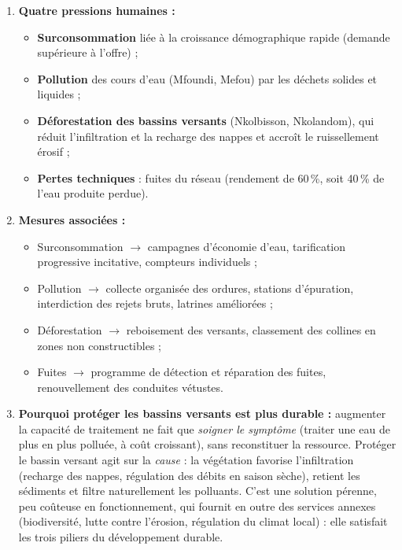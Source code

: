 \documentclass[11pt]{article}
\begin{document}
\begin{corrige}
\begin{enumerate}
\item \textbf{Quatre pressions humaines :}
\begin{itemize}
\item \textbf{Surconsommation} liée à la croissance démographique rapide (demande supérieure à l'offre) ;
\item \textbf{Pollution} des cours d'eau (Mfoundi, Mefou) par les déchets solides et liquides ;
\item \textbf{Déforestation des bassins versants} (Nkolbisson, Nkolandom), qui réduit l'infiltration et la recharge des nappes et accroît le ruissellement érosif ;
\item \textbf{Pertes techniques} : fuites du réseau (rendement de 60\,\%, soit 40\,\% de l'eau produite perdue).
\end{itemize}
\item \textbf{Mesures associées :}
\begin{itemize}
\item Surconsommation $\to$ campagnes d'économie d'eau, tarification progressive incitative, compteurs individuels ;
\item Pollution $\to$ collecte organisée des ordures, stations d'épuration, interdiction des rejets bruts, latrines améliorées ;
\item Déforestation $\to$ reboisement des versants, classement des collines en zones non constructibles ;
\item Fuites $\to$ programme de détection et réparation des fuites, renouvellement des conduites vétustes.
\end{itemize}
\item \textbf{Pourquoi protéger les bassins versants est plus durable :} augmenter la capacité de traitement ne fait que \emph{soigner le symptôme} (traiter une eau de plus en plus polluée, à coût croissant), sans reconstituer la ressource. Protéger le bassin versant agit sur la \emph{cause} : la végétation favorise l'infiltration (recharge des nappes, régulation des débits en saison sèche), retient les sédiments et filtre naturellement les polluants. C'est une solution pérenne, peu coûteuse en fonctionnement, qui fournit en outre des services annexes (biodiversité, lutte contre l'érosion, régulation du climat local) : elle satisfait les trois piliers du développement durable.
\end{enumerate}
\end{corrige}
\end{document}
